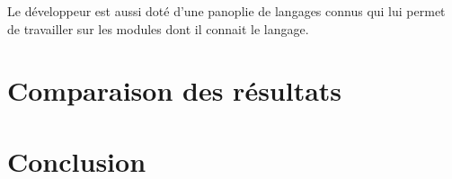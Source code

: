 \documentclass{article}
\begin{document}
Le développeur est aussi doté d'une panoplie de langages connus qui lui permet de travailler sur les modules dont il connait le langage.

\section{Comparaison des résultats}


\section{Conclusion}
\end{document}
